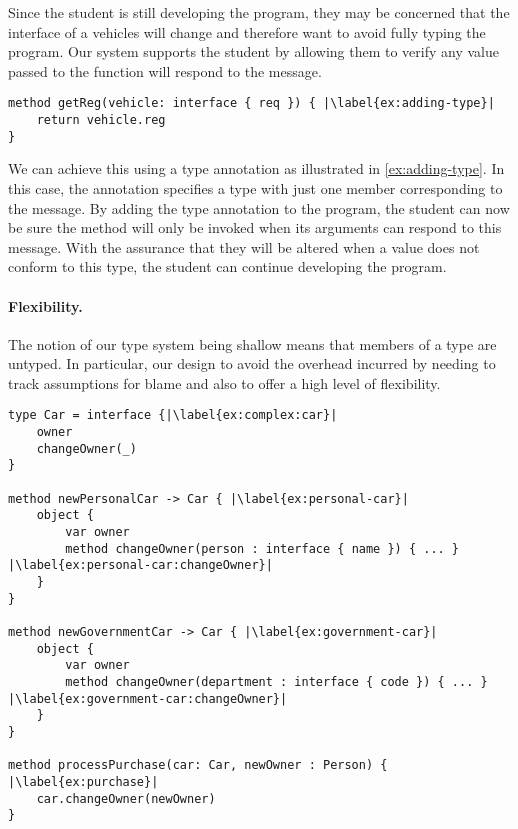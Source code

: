 Since the student is still developing the program, 
they may be concerned that the interface of a vehicles will change 
and therefore want to avoid fully typing the program.
Our system supports the student by allowing them to verify
any value passed to the  function will respond
to the  message. 


\begin{lstlisting}[caption={Adding a type annotation to a method parameter.},escapechar=|]
method getReg(vehicle: interface { req }) { |\label{ex:adding-type}|
    return vehicle.reg
}
\end{lstlisting}

We can achieve this using a type annotation 
as illustrated in \cref{ex:adding-type}. 
In this case, 
the annotation specifies a type with just one member
corresponding to the  message.
By adding the type annotation to the program, 
the student can now be sure the  method
will only be invoked when its arguments can respond to this message.
With the assurance that they will be altered when a value 
does not conform to this type,
the student can continue developing the program.

\paragraph{Flexibility.}

The notion of our type system being shallow means 
that members of a type are untyped.
In particular, our design 
to avoid the overhead incurred by needing to track assumptions for blame and
also to offer a high level of flexibility.

\begin{lstlisting}[caption={A well-typed but globally inconsistent program.},escapechar=|,label={ex:complex}]
type Car = interface {|\label{ex:complex:car}|
    owner
    changeOwner(_)
}

method newPersonalCar -> Car { |\label{ex:personal-car}|
    object {
        var owner
        method changeOwner(person : interface { name }) { ... } |\label{ex:personal-car:changeOwner}|
    }
}

method newGovernmentCar -> Car { |\label{ex:government-car}|
    object {
        var owner
        method changeOwner(department : interface { code }) { ... } |\label{ex:government-car:changeOwner}|
    }
}

method processPurchase(car: Car, newOwner : Person) { |\label{ex:purchase}|
    car.changeOwner(newOwner)
}
\end{lstlisting}

